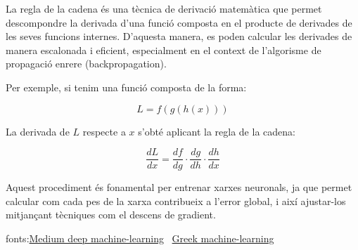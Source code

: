 La regla de la cadena és una tècnica de derivació matemàtica que permet descompondre la derivada d'una funció composta en el producte de derivades de les seves funcions internes. D’aquesta manera, es poden calcular les derivades de manera escalonada i eficient, especialment en el context de l’algorisme de propagació enrere (backpropagation).

Per exemple, si tenim una funció composta de la forma:

\[
L = f(g(h(x)))
\]

La derivada de \( L \) respecte a \( x \) s'obté aplicant la regla de la cadena:

\[
\frac{dL}{dx} = \frac{df}{dg} \cdot \frac{dg}{dh} \cdot \frac{dh}{dx}
\]

Aquest procediment és fonamental per entrenar xarxes neuronals, ja que permet calcular com cada pes de la xarxa contribueix a l'error global, i així ajustar-los mitjançant tècniques com el descens de gradient.

fonts:\href{https://medium.com/%40ppuneeth73/the-chain-rule-of-calculus-the-backbone-of-deep-learning-backpropagation-9d35affc05e7}{Medium deep machine-learning} \ \href{https://www.geeksforgeeks.org/machine-learning/chain-rule-derivative-in-machine-learning/}{Greek machine-learning}



